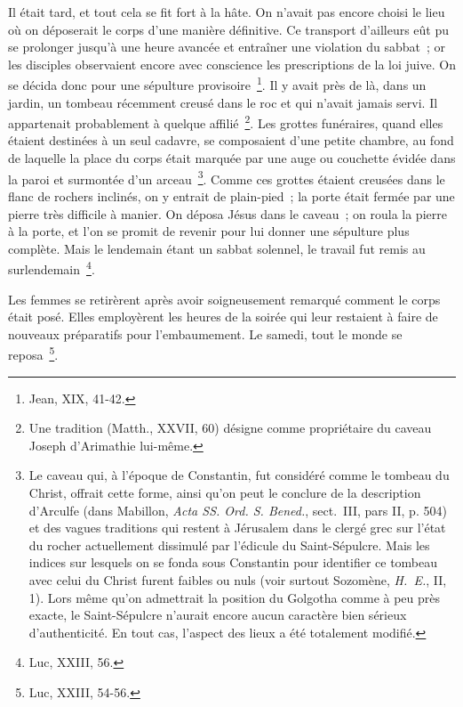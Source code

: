 \documentclass[french,twoside]{book} %
\begin{document}
Il était tard, et tout cela se fit fort à la hâte. On n’avait pas encore choisi le lieu où on déposerait le corps d’une manière définitive. Ce transport d’ailleurs eût pu se prolonger jusqu’à une heure avancée et entraîner une violation du sabbat ; or les disciples observaient encore avec conscience les prescriptions de la loi juive. On se décida donc pour une sépulture provisoire \footnote{Jean, XIX, 41-42.}. Il y avait près de là, dans un jardin, un tombeau récemment creusé dans le roc et qui n’avait jamais servi. Il appartenait probablement à quelque affilié \footnote{Une tradition (Matth., XXVII, 60) désigne comme propriétaire du caveau Joseph d’Arimathie lui-même.}. Les grottes funéraires, quand elles étaient destinées à un seul cadavre, se composaient d’une petite chambre, au fond de laquelle la place du corps était marquée par une auge ou couchette évidée dans la paroi et surmontée d’un arceau \footnote{ Le caveau qui, à l’époque de Constantin, fut considéré comme le tombeau du Christ, offrait cette forme, ainsi qu’on peut le conclure de la description d’Arculfe (dans Mabillon, {\itshape Acta SS. Ord. S. Bened.}, sect. III, pars II, p. 504) et des vagues traditions qui restent à Jérusalem dans le clergé grec sur l’état du rocher actuellement dissimulé par l’édicule du Saint-Sépulcre. Mais les indices sur lesquels on se fonda sous Constantin pour identifier ce tombeau avec celui du Christ furent faibles ou nuls (voir surtout Sozomène, {\itshape H. E.}, II, 1). Lors même qu’on admettrait la position du Golgotha comme à peu près exacte, le Saint-Sépulcre n’aurait encore aucun caractère bien sérieux d’authenticité. En tout cas, l’aspect des lieux a été totalement modifié.}. Comme ces grottes étaient creusées dans le flanc de rochers inclinés, on y entrait de plain-pied ; la porte était fermée par une pierre très difficile à manier. On déposa Jésus dans le caveau ; on roula la pierre à la porte, et l’on se promit de revenir pour lui donner une sépulture plus complète. Mais le lendemain étant un sabbat solennel, le travail fut remis au surlendemain \footnote{Luc, XXIII, 56.}.\par
Les femmes se retirèrent après avoir soigneusement remarqué comment le corps était posé. Elles employèrent les heures de la soirée qui leur restaient à faire de nouveaux préparatifs pour l’embaumement. Le samedi, tout le monde se reposa \footnote{Luc, XXIII, 54-56.}.\par
\end{document}
